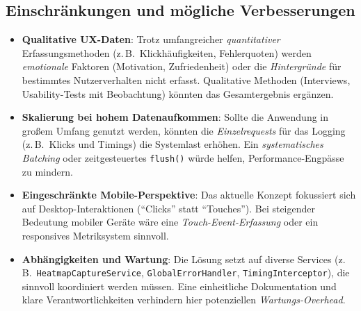 \documentclass[12pt,oneside]{article}
\begin{document}
\subsection{Einschränkungen und mögliche Verbesserungen}
\begin{itemize}
    \item \textbf{Qualitative UX-Daten}:
    Trotz umfangreicher \emph{quantitativer} Erfassungsmethoden (z.\,B.\ Klickhäufigkeiten, Fehlerquoten) werden \emph{emotionale} Faktoren (Motivation, Zufriedenheit) oder die \emph{Hintergründe} für bestimmtes Nutzerverhalten nicht erfasst. Qualitative Methoden (Interviews, Usability-Tests mit Beobachtung) könnten das Gesamtergebnis ergänzen.
    \item \textbf{Skalierung bei hohem Datenaufkommen}:
    Sollte die Anwendung in großem Umfang genutzt werden, könnten die \emph{Einzelrequests} für das Logging (z.\,B.\ Klicks und Timings) die Systemlast erhöhen. Ein \emph{systematisches Batching} oder zeitgesteuertes \texttt{flush()} würde helfen, Performance-Engpässe zu mindern.
    \item \textbf{Eingeschränkte Mobile-Perspektive}:
    Das aktuelle Konzept fokussiert sich auf Desktop-Interaktionen (\enquote{Clicks} statt \enquote{Touches}). Bei steigender Bedeutung mobiler Geräte wäre eine \emph{Touch-Event-Erfassung} oder ein responsives Metriksystem sinnvoll.
    \item \textbf{Abhängigkeiten und Wartung}:
    Die Lösung setzt auf diverse Services (z.\,B.\ \texttt{HeatmapCaptureService}, \texttt{GlobalErrorHandler}, \texttt{TimingInterceptor}), die sinnvoll koordiniert werden müssen. Eine einheitliche Dokumentation und klare Verantwortlichkeiten verhindern hier potenziellen \emph{Wartungs-Overhead}.
\end{itemize}
\end{document}

